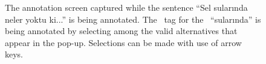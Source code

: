 \begin{figure}[tbh]
    \centering
    \caption{The annotation screen captured while the sentence ``Sel sularında neler yoktu ki...'' is being annotated. The \deprel\ tag for the \form\ ``sularında'' is being annotated by selecting among the valid alternatives that appear in the pop-up. Selections can be made with use of arrow keys.}
    \label{fig:anno-fig}
\end{figure}

